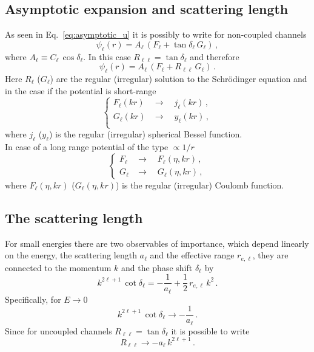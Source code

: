 \documentclass[10pt,a4paper]{article}
\newcommand{\eq}[1]{Eq.~#1}
\begin{document}
	
	\begin{appendices}
		\section{Asymptotic expansion and scattering length}
		As seen in \eq{\eqref{eq:asymptotic_u}} it is possibly to write for non-coupled channels
		\begin{equation}
			\psi_\ell(r) = 
			A_\ell\,
			\left(
				F_\ell
				+ \tan \delta_\ell \,
				G_\ell
			\right)\,,
		\end{equation}
		where $A_\ell \equiv C_\ell\, \cos \delta_\ell$.
		In this case $R_{\ell \ell } = \tan \delta_\ell$ and therefore
		\begin{equation}
			\psi_\ell(r) = 
			A_\ell\,
			\left(
			F_\ell
			+ R_{\ell\ell} \,
			G_\ell
			\right)\,.
		\end{equation}
		Here $R_\ell$ ($G_\ell$) are the regular (irregular) solution to the Schr\"odinger equation and in the case if the potential is short-range 
		\begin{equation}
			\begin{cases}
				F_\ell(kr) &\rightarrow\quad j_\ell(kr)\,,\\
				G_\ell(kr) &\rightarrow\quad y_\ell(kr)\,,\\
			\end{cases}
		\end{equation}
		where $j_\ell$ ($y_\ell$) is the regular (irregular) spherical Bessel function.\\
		In case of a long range potential of the type $\propto 1/r$ 
		\begin{equation}
			\begin{cases}
				F_\ell & \rightarrow \quad F_\ell(\eta, kr)\,,\\
				G_\ell & \rightarrow \quad G_\ell(\eta, kr)\,,
			\end{cases}
		\end{equation}
		where $F_\ell(\eta,kr)$ ($G_\ell(\eta,kr)$) is the regular (irregular) Coulomb function.
		
		\subsection{The scattering length}
		For small energies there are two observables of importance, which depend linearly on the energy, the scattering length $a_\ell$ and the effective range $r_{e,\ell}$, they are connected to the momentum $k$ and the phase shift $\delta_\ell$ by 
		\begin{equation}
			k^{2\ell+1}\,\cot\delta_\ell = -\frac{1}{a_\ell} + \frac{1}{2}\,r_{e,\ell}\,k^2\,. 
		\end{equation}
		Specifically, for $E\rightarrow 0$ 
		\begin{equation}
			k^{2\ell+1}\,\cot\delta_\ell\rightarrow -\frac{1}{a_\ell}\,.
		\end{equation}
		Since for uncoupled channels $R_{\ell\ell}=\tan\delta_\ell$ it is possible to write
		\begin{equation}
			R_{\ell\ell} \rightarrow 
			-a_\ell\,k^{2\ell+1}\,.
		\end{equation}
		

\end{appendices}
\end{document}
